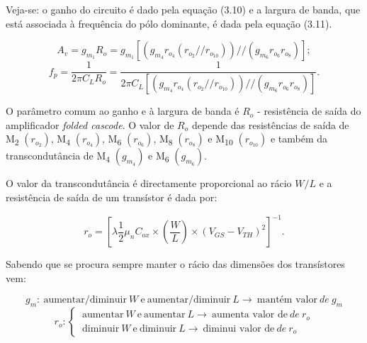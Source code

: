 \documentclass[11pt]{article}
\numberwithin{equation}{section}
\begin{document}
Veja-se: o ganho do circuito é dado pela equação (3.10) e a largura de banda, que está associada à frequência do pólo dominante, é dada pela equação (3.11).

\vspace{-3mm}
\begin{equation}
A_{v} = g_{m_1} R_o =  g_{m_1}\left[\left(g_{m_4}r_{o_4}\left(r_{o_2}//r_{o_{10}}\right)\right)//\left(g_{m_6}r_{o_6}r_{o_8}\right)\right];
\end{equation}
\vspace{-2mm}
\begin{equation}
f_{p} = \frac{1}{2\pi C_L R_o} = \frac{1}{2\pi C_L \left[\left(g_{m_4}r_{o_4}\left(r_{o_2}//r_{o_{10}}\right)\right)//\left(g_{m_6}r_{o_6}r_{o_8}\right)\right]}.
\end{equation}

\vspace{4mm}

O parâmetro comum ao ganho e à largura de banda é $R_o$ - resistência de saída do amplificador \textit{folded cascode}. O valor de $R_o$ depende das resistências de saída de M\textsubscript{2} $\left(r_{o_2}\right)$, M\textsubscript{4} $\left(r_{o_4}\right)$, M\textsubscript{6} $\left(r_{o_6}\right)$, M\textsubscript{8} $\left(r_{o_8}\right)$ e M\textsubscript{10} $\left(r_{o_{10}}\right)$ e também da transcondutância de M\textsubscript{4} $\left(g_{m_4}\right)$ e M\textsubscript{6} $\left(g_{m_6}\right)$. 

O valor da transcondutância é directamente proporcional ao rácio $W/L$ e a resistência de saída de um transístor é dada por:

\vspace{-3mm}
\begin{equation}
r_{o} = \left[\lambda \frac{1}{2}\mu_{n}C_{ox}\times \left(\frac{W}{L}\right) \times \left(V_{GS}-V_{TH}\right)^2\right]^{-1}.
\end{equation}

\vspace{1mm}
Sabendo que se procura sempre manter o rácio das dimensões dos transístores vem:

\vspace{-3mm}
\begin{equation}
g_{m}: ~\text{aumentar/diminuir}~W~\text{e}~\text{aumentar/diminuir}~L \rightarrow~\text{mantém valor}~de~g_{m}
\end{equation}
\begin{equation}
r_{o}:  \begin{cases} ~\text{aumentar}~W~\text{e}~\text{aumentar}~L \rightarrow~\text{aumenta valor de}~de~r_{o} \\ ~\text{diminuir}~W~\text{e}~\text{diminuir}~L \rightarrow~\text{diminui valor de}~de~r_{o} \end{cases}
\end{equation}
\end{document}
